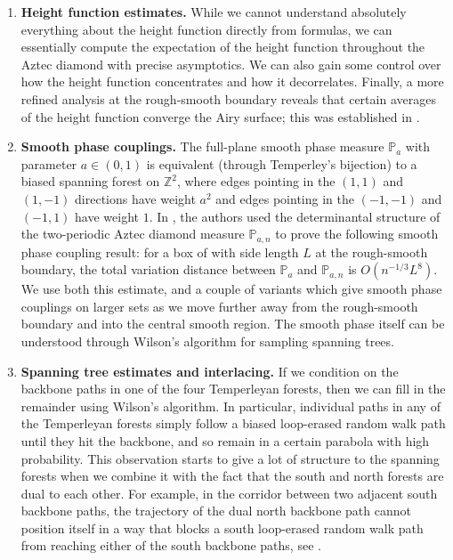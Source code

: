 \documentclass[11pt,twoside]{amsart}
\theoremstyle{plain}
\numberwithin{quest}{section}
\theoremstyle{remark}
\numberwithin{rem}{section}
\theoremstyle{definition}
\newcommand{\Z}{\mathbb{Z}}
\renewcommand{\P}{\mathbb{P}}
\begin{document}
	\begin{enumerate}[label=\arabic*.]
		\item \textbf{Height function estimates.} \qquad While we cannot understand absolutely everything about the height function directly from formulas, we can essentially compute the expectation of the height function throughout the Aztec diamond with precise asymptotics. We can also gain some control over how the height function concentrates and how it decorrelates. Finally, a more refined analysis at the rough-smooth boundary reveals that certain averages of the height function converge the Airy surface; this was established in \cite{BCJ18}. 
		\item \textbf{Smooth phase couplings.} \quad The full-plane smooth phase measure $\P_a$ with parameter $a \in (0, 1)$ is equivalent (through Temperley's bijection) to a biased spanning forest on $\Z^2$, where edges pointing in the $(1, 1)$ and $(1, -1)$ directions have weight $a^2$ and edges pointing in the $(-1, -1)$ and $(-1, 1)$ have weight $1$. In \cite{BCJ22}, the authors used the determinantal structure of the two-periodic Aztec diamond measure $\P_{a, n}$ to prove the following smooth phase coupling result: for a box of with side length $L$ at the rough-smooth boundary, the total variation distance between $\P_a$ and $\P_{a, n}$ is $O(n^{-1/3} L^8)$. We use both this estimate, and a couple of variants which give smooth phase couplings on larger sets as we move further away from the rough-smooth boundary and into the central smooth region. The smooth phase itself can be understood through Wilson's algorithm for sampling spanning trees.
		\item \textbf{Spanning tree estimates and interlacing.} \qquad  If we condition on the backbone paths in one of the four Temperleyan forests, then we can fill in the remainder using Wilson's algorithm. In particular, individual paths in any of the Temperleyan forests simply follow a biased loop-erased random walk path until they hit the backbone, and so remain in a certain parabola with high probability. This observation starts to give a lot of structure to the spanning forests when we combine it with the fact that the south and north forests are dual to each other. For example, in the corridor between two adjacent south backbone paths, the trajectory of the dual north backbone path cannot position itself in a way that blocks a south loop-erased random walk path from reaching either of the south backbone paths, see .
	\end{enumerate}
\end{document}
